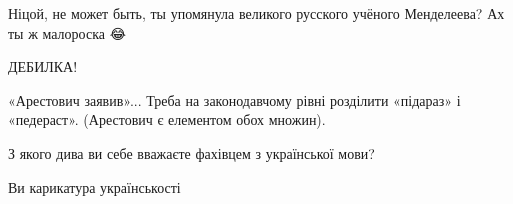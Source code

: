\begin{itemize}
\begin{itemize}
\begin{itemize}
\end{itemize}

\end{itemize}

 
Ніцой, не может быть, ты упомянула великого русского учёного Менделеева? Ах ты ж малороска 😂🖕

 
ДЕБИЛКА!

 
«Арестович заявив»...
Треба на законодавчому рівні розділити «підараз» і «педераст». (Арестович є елементом обох множин).

 

З якого дива ви себе вважаєте фахівцем з української мови?

Ви карикатура українськості


\end{itemize}

